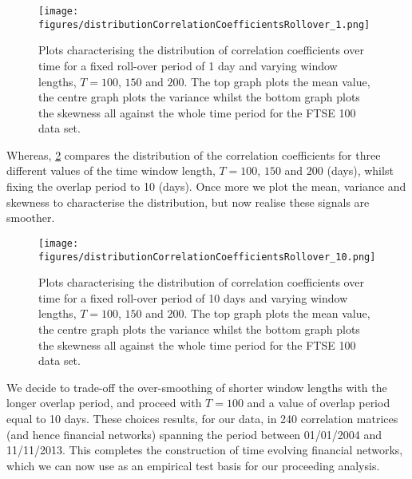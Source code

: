 \begin{figure}
	\centering
	\texttt{[image: figures/distributionCorrelationCoefficientsRollover\_1.png]}
	\caption[Plots characterising the distribution of correlation coefficients for a fixed roll-over period of 1 day and varying window lengths.]{\label{fig:distributionCorrelationCoefficientsRollover1} Plots characterising the distribution of correlation coefficients over time for a fixed roll-over period of 1 day and varying window lengths, $T=100$, $150$ and $200$. The top graph plots the mean value, the centre graph plots the variance whilst the bottom graph plots the skewness all against the whole time period for the FTSE 100 data set.}
\end{figure}

Whereas, \cref{fig:distributionCorrelationCoefficientsRollover10} compares the distribution of the correlation coefficients for three different values of the time window length, $T=100$, $150$ and $200$ (days), whilst fixing the overlap period to 10 (days).
Once more we plot the mean, variance and skewness to characterise the distribution, but now realise these signals are smoother.

\begin{figure}
	\centering
	\texttt{[image: figures/distributionCorrelationCoefficientsRollover\_10.png]}
	\caption[Plots characterising the distribution of correlation coefficients for a fixed roll-over period of 10 days and varying window lengths.]{\label{fig:distributionCorrelationCoefficientsRollover10} Plots characterising the distribution of correlation coefficients over time for a fixed roll-over period of 10 days and varying window lengths, $T=100$, $150$ and $200$. The top graph plots the mean value, the centre graph plots the variance whilst the bottom graph plots the skewness all against the whole time period for the FTSE 100 data set.}
\end{figure}

We decide to trade-off the over-smoothing of shorter window lengths with the longer overlap period, and proceed with $T=100$ and a value of overlap period equal to 10 days.
These choices results, for our data, in 240 correlation matrices (and hence financial networks) spanning the period between 01/01/2004 and 11/11/2013.
This completes the construction of time evolving financial networks, which we can now use as an empirical test basis for our proceeding analysis.


